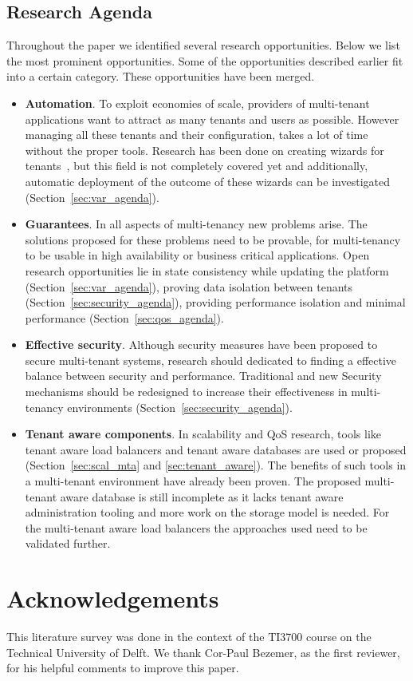 \documentclass{article}
\newcommand{\highlight}[1]{\colorbox{yellow}{#1}}
\begin{document}
\subsection{Research Agenda}
\label{sec:ra}
Throughout the paper we identified several research opportunities. Below we list the most prominent opportunities. Some of the opportunities described earlier fit into a certain category. These opportunities have been merged.
\begin{itemize}

\item \textbf{Automation}. 
To exploit economies of scale, providers of multi-tenant applications want to attract as many tenants and users as possible. 
However managing all these tenants and their configuration, takes a lot of time without the proper tools. 
Research has been done on creating wizards for tenants~\cite{mietzner2008generation,mietzner2008defining}, but this field is not completely covered yet and additionally, automatic deployment of the outcome of these wizards can be investigated (Section~\ref{sec:var_agenda}).
\item \textbf{Guarantees}. 
In all aspects of multi-tenancy new problems arise. 
The solutions proposed for these problems need to be provable, for multi-tenancy to be usable in high availability or business critical applications. 
Open research opportunities lie in state consistency while updating the platform (Section~\ref{sec:var_agenda}), proving data isolation between tenants (Section~\ref{sec:security_agenda}), providing performance isolation and minimal performance (Section~\ref{sec:qos_agenda}).
\item \textbf{Effective security}.
Although security measures have been proposed to secure multi-tenant systems, research should dedicated to finding a effective balance between security and performance. Traditional and new Security mechanisms should be redesigned to increase their effectiveness in multi-tenancy environments (Section~\ref{sec:security_agenda}).
\item \textbf{Tenant aware components}.
In scalability and \ac{QoS} research, tools like tenant aware load balancers and tenant aware databases are used or proposed (Section~\ref{sec:scal_mta} and \ref{sec:tenant_aware}).
The benefits of such tools in a multi-tenant environment have already been proven.
The proposed multi-tenant aware database is still incomplete as it lacks tenant aware administration tooling and more work on the storage model is needed. 
For the multi-tenant aware load balancers the approaches used need to be validated further.

\end{itemize}

\section{Acknowledgements}
This literature survey was done in the context of the TI3700 course on the Technical University of Delft. We thank Cor-Paul Bezemer, as the first reviewer, for his helpful comments to improve this paper.



\end{document}
